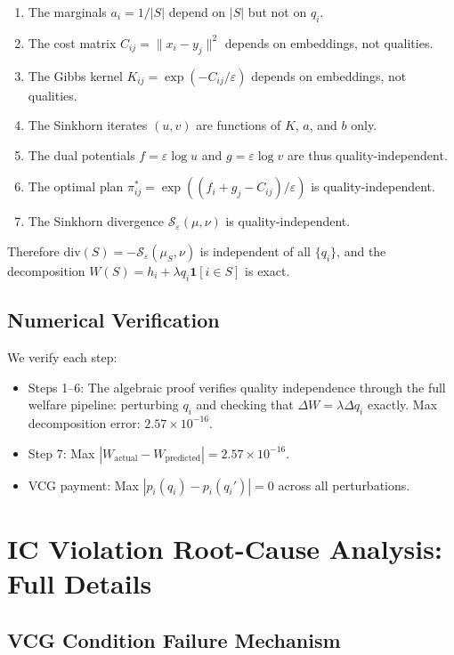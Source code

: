 \documentclass[10pt]{article}
\begin{document}
\begin{enumerate}
\item The marginals $a_i = 1/|S|$ depend on $|S|$ but not on $q_i$.
\item The cost matrix $C_{ij} = \|x_i - y_j\|^2$ depends on embeddings, not qualities.
\item The Gibbs kernel $K_{ij} = \exp(-C_{ij}/\varepsilon)$ depends on embeddings, not qualities.
\item The Sinkhorn iterates $(u, v)$ are functions of $K$, $a$, and $b$ only.
\item The dual potentials $f = \varepsilon \log u$ and $g = \varepsilon \log v$ are thus quality-independent.
\item The optimal plan $\pi^*_{ij} = \exp((f_i + g_j - C_{ij})/\varepsilon)$ is quality-independent.
\item The Sinkhorn divergence $\mathcal{S}_\varepsilon(\mu, \nu)$ is quality-independent.
\end{enumerate}

Therefore $\mathrm{div}(S) = -\mathcal{S}_\varepsilon(\mu_S, \nu)$ is independent of all $\{q_i\}$, and the decomposition $W(S) = h_i + \lambda q_i \mathbf{1}[i \in S]$ is exact.

\subsection{Numerical Verification}

We verify each step:
\begin{itemize}
\item Steps 1--6: The algebraic proof verifies quality independence through the full welfare pipeline: perturbing $q_i$ and checking that $\Delta W = \lambda \Delta q_i$ exactly. Max decomposition error: $2.57 \times 10^{-16}$.
\item Step 7: Max $|W_{\text{actual}} - W_{\text{predicted}}| = 2.57 \times 10^{-16}$.
\item VCG payment: Max $|p_i(q_i) - p_i(q_i')| = 0$ across all perturbations.
\end{itemize}

\section{IC Violation Root-Cause Analysis: Full Details}
\label{app:ic}

\subsection{VCG Condition Failure Mechanism}
\end{document}
